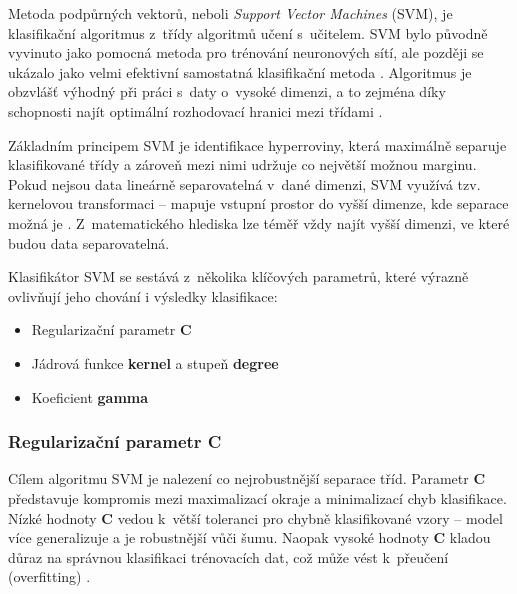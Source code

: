 Metoda podpůrných vektorů, neboli \textit{Support Vector Machines} (SVM), je klasifikační algoritmus z~třídy algoritmů učení s~učitelem. SVM bylo původně vyvinuto jako pomocná metoda pro trénování neuronových sítí, ale později se ukázalo jako velmi efektivní samostatná klasifikační metoda \cite{cortes1995support}. Algoritmus je obzvlášť výhodný při práci s~daty o~vysoké dimenzi, a to zejména díky schopnosti najít optimální rozhodovací hranici mezi třídami \cite{GuyonElisseeff2003}.

Základním principem SVM je identifikace hyperroviny, která maximálně separuje klasifikované třídy a zároveň mezi nimi udržuje co největší možnou marginu. Pokud nejsou data lineárně separovatelná v~dané dimenzi, SVM využívá tzv. kernelovou transformaci – mapuje vstupní prostor do vyšší dimenze, kde separace možná je \cite{kernel_types}. Z~matematického hlediska lze téměř vždy najít vyšší dimenzi, ve které budou data separovatelná.

Klasifikátor SVM se sestává z~několika klíčových parametrů, které výrazně ovlivňují jeho chování i výsledky klasifikace:
\begin{itemize}
    \item Regularizační parametr \textbf{C}
    \item Jádrová funkce \textbf{kernel} a stupeň \textbf{degree}
    \item Koeficient \textbf{gamma}
\end{itemize}

\subsubsection{Regularizační parametr C}

Cílem algoritmu SVM je nalezení co nejrobustnější separace tříd. Parametr \textbf{C} představuje kompromis mezi maximalizací okraje a minimalizací chyb klasifikace. Nízké hodnoty \textbf{C} vedou k~větší toleranci pro chybně klasifikované vzory – model více generalizuje a je robustnější vůči šumu. Naopak vysoké hodnoty \textbf{C} kladou důraz na správnou klasifikaci trénovacích dat, což může vést k~přeučení (overfitting) \cite{cortes1995support, kernel_types}.


